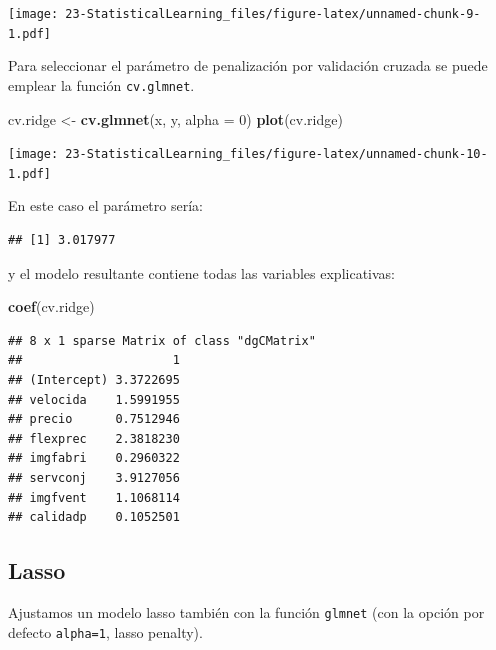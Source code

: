 \documentclass[]{book}
\newenvironment{Shaded}{\begin{snugshade}}{\end{snugshade}}
\newcommand{\DataTypeTok}[1]{\textcolor[rgb]{0.13,0.29,0.53}{#1}}
\newcommand{\DecValTok}[1]{\textcolor[rgb]{0.00,0.00,0.81}{#1}}
\newcommand{\FloatTok}[1]{\textcolor[rgb]{0.00,0.00,0.81}{#1}}
\newcommand{\KeywordTok}[1]{\textcolor[rgb]{0.13,0.29,0.53}{\textbf{#1}}}
\newcommand{\NormalTok}[1]{#1}
\newcommand{\OperatorTok}[1]{\textcolor[rgb]{0.81,0.36,0.00}{\textbf{#1}}}
\newcommand{\StringTok}[1]{\textcolor[rgb]{0.31,0.60,0.02}{#1}}
\begin{document}
\texttt{[image: 23-StatisticalLearning\_files/figure-latex/unnamed-chunk-9-1.pdf]}

Para seleccionar el parámetro de penalización por validación cruzada se puede emplear
la función \texttt{cv.glmnet}.

\begin{Shaded}
\begin{Highlighting}[]
\NormalTok{cv.ridge <-}\StringTok{ }\KeywordTok{cv.glmnet}\NormalTok{(x, y, }\DataTypeTok{alpha =} \DecValTok{0}\NormalTok{)}
\KeywordTok{plot}\NormalTok{(cv.ridge)}
\end{Highlighting}
\end{Shaded}

\texttt{[image: 23-StatisticalLearning\_files/figure-latex/unnamed-chunk-10-1.pdf]}

En este caso el parámetro sería:

\begin{Shaded}
\end{Shaded}

\begin{verbatim}
## [1] 3.017977
\end{verbatim}

y el modelo resultante contiene todas las variables explicativas:

\begin{Shaded}
\begin{Highlighting}[]
\KeywordTok{coef}\NormalTok{(cv.ridge)}
\end{Highlighting}
\end{Shaded}

\begin{verbatim}
## 8 x 1 sparse Matrix of class "dgCMatrix"
##                     1
## (Intercept) 3.3722695
## velocida    1.5991955
## precio      0.7512946
## flexprec    2.3818230
## imgfabri    0.2960322
## servconj    3.9127056
## imgfvent    1.1068114
## calidadp    0.1052501
\end{verbatim}

\hypertarget{lasso}{%
\subsection{Lasso}\label{lasso}}

Ajustamos un modelo lasso también con la función \texttt{glmnet} (con la opción por defecto \texttt{alpha=1}, lasso penalty).
\end{document}
